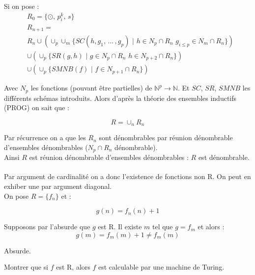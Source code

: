 \documentclass[12pt,letterpaper,boxed]{hmcpset}
\begin{document}
\begin{solution}
Si on pose : 
\begin{align*}
& R_{0}  = \{ \odot, \, p^{k}_{i}, \, s \} \\
& R_{n+1}  = \\ 
& R_{n} \cup ( \cup_{p} \cup_{m} \{ SC(h,g_{1}, \, \dots \, , g_{p}) \, \, | \, \, h \in  N_{p} \cap R_{n} \, \, g_{i \leq p} \in N_{m} \cap R_{n}  \} ) \\ 
& \cup (\cup_{p} \{ SR(g,h) \, \, | \, \, g \in N_{p} \cap R_{n} \, \, h \in N_{p+2} \cap R_{n} \}) \\
& \cup (\cup_{p} \{ SMNB(f) \, \, | \, \, f \in N_{p+1} \cap R_{n} \})
 \end{align*}
 
 
 Avec $N_{p}$ les fonctions (pouvant être partielles) de $\mathbb{N}^{p} \to \mathbb{N}$. Et $SC$, $SR$, $SMNB$ les différents schémas introduits. Alors d'après la théorie des ensembles inductifs (PROG) on sait que :
 
 $$ R = \cup_{n} R_{n} $$

\noindent Par récurrence on a que les $R_{n}$ sont dénombrables par réunion dénombrable d'ensembles dénombrables ($N_{p}\cap R_{n}$ dénombrable). \\
Ainsi $R$ est réunion dénombrable d'ensembles dénombrables : $R$ est dénombrable. \\
\\
Par argument de cardinalité on a donc l'existence de fonctions non R. On peut en exhiber une par argument diagonal. \\
On pose $R = \{ f_{n} \}$ et : 

$$ g(n) = f_{n}(n) + 1$$

\noindent Supposons par l'absurde que $g$ est R. Il existe $m$ tel que $g = f_m$ et alors : 
$$ g(m) = f_{m}(m) + 1 \neq f_{m}(m)$$

\noindent Absurde.

\end{solution}

\begin{problem}[Question 5]
Montrer que si $f$ est R, alors $f$ est calculable par une machine de Turing.
\end{problem}
\end{document}
